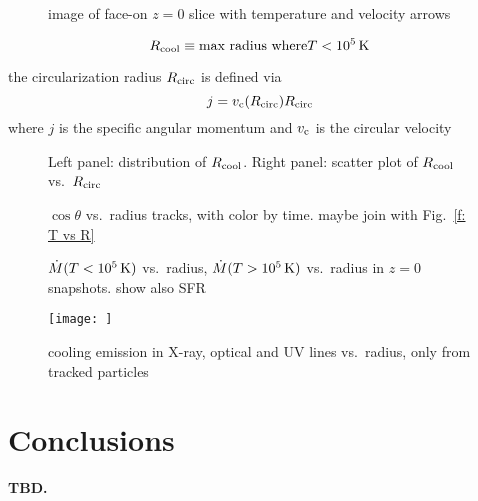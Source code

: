 \documentclass[fleqn,usenatbib]{mnras}
\begin{document}
\begin{figure}
    \centering
    \caption{image of face-on $z=0$ slice with temperature and velocity arrows}
    \label{f:slice}
\end{figure}

\newcommand{\Rcool}{R_{\rm cool}} %
\begin{equation}
    \Rcool \equiv \text{max radius where} T<10^5\,{\rm K}
\end{equation}

\newcommand{\Mdot}{\dot{M}}
\newcommand{\Rcirc}{R_{\rm circ}} %

the circularization radius $\Rcirc$ is defined via
\begin{equation}
    j = v_{\rm c}(\Rcirc)\Rcirc
\end{equation}
where $j$ is the specific angular momentum and $v_{\rm c}$ is the circular velocity

\begin{figure}
    \centering
    \caption{Left panel: distribution of $\Rcool$. Right panel: scatter plot of $\Rcool$ vs.~$\Rcirc$}
    \label{f:Rcool}
\end{figure}


\begin{figure}
    \centering
    \caption{ $\cos \theta$ vs.\ radius tracks, with color by time. maybe join with Fig.~\ref{f: T vs R}}
    \label{f: theta vs R}
\end{figure}


\begin{figure}
    \centering
    \caption{$\Mdot(T<10^{5}\,{\rm K})$ vs.\ radius, $\Mdot(T>10^{5}\,{\rm K})$ vs.\ radius in $z=0$ snapshots. show also SFR}
    \label{f:Mdot}
\end{figure}

\begin{figure}
    \centering
    \texttt{[image: ]}
    \caption{cooling emission in X-ray, optical and UV lines vs.\ radius, only from tracked particles}
    \label{f:emission}
\end{figure}

\section{Conclusions}

\textbf{TBD.}
\end{document}
